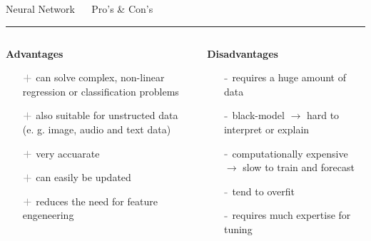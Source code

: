 \documentclass[11pt,compress,t,notes=noshow, xcolor=table]{beamer}
\begin{document}

\LARGE
\begin{frame}{\textcolor{gray!80}{Neural Network} ~~ Pro's \& Con's}
\normalsize
\vspace{-0.5cm}
\noindent \textcolor{gray!80}{\rule{\textwidth}{1pt}}

\vspace{0.3cm}

\footnotesize


\begin{columns}[onlytextwidth]
  \begin{column}{0.5\textwidth}
    \textbf{\textcolor{gray!80}{Advantages}}
    \footnotesize
    \begin{itemize}
      \item[$\textbf{\textcolor{gray!80}{+}}$] can solve complex, non-linear regression or classification problems 
      \item[$\textbf{\textcolor{gray!80}{+}}$] also suitable for unstructed data (e. g. image, audio and text data)  
      \item[$\textbf{\textcolor{gray!80}{+}}$] very accuarate 
      \item[$\textbf{\textcolor{gray!80}{+}}$] can easily be updated %
      \item[$\textbf{\textcolor{gray!80}{+}}$] reduces the need for feature engeneering
    \end{itemize}
  \end{column}

  \begin{column}{0.5\textwidth}
    \textbf{\textcolor{gray!80}{Disadvantages}}
    \footnotesize
    \begin{itemize}
      \item[$\textbf{\textcolor{gray!80}{-}}$] requires a huge amount of data
      \item[$\textbf{\textcolor{gray!80}{-}}$] black-model $\rightarrow$ hard to interpret or explain
      \item[$\textbf{\textcolor{gray!80}{-}}$] computationally expensive $\rightarrow$ slow to train and forecast
      \item[$\textbf{\textcolor{gray!80}{-}}$] tend to overfit
      \item[$\textbf{\textcolor{gray!80}{-}}$] requires much expertise for tuning
    \end{itemize}
  \end{column}
\end{columns}

\vfill

\small


\end{frame}
\end{document}
